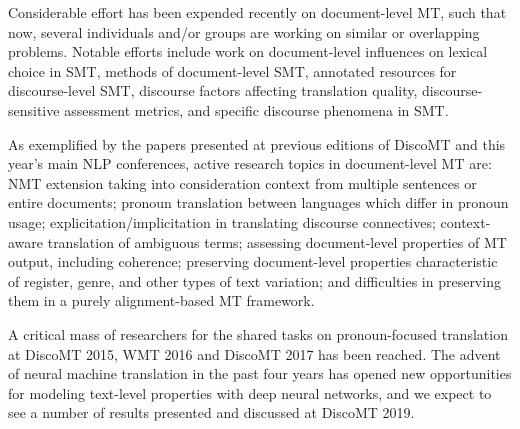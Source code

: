 \documentclass[11pt]{article}
\begin{document}
Considerable effort has been expended recently on document-level MT, such that now, several
individuals and/or groups are working on similar or overlapping problems.
Notable efforts include work on document-level influences on lexical choice in SMT, methods of document-level
SMT, annotated resources for discourse-level SMT, discourse factors affecting translation quality,
discourse-sensitive assessment metrics, and specific discourse phenomena in SMT.

As exemplified by the papers presented at previous editions of DiscoMT
and this year's main NLP conferences, active research topics in document-level MT are: 
NMT extension taking into consideration context from multiple sentences or
entire documents;
pronoun translation between languages which differ in pronoun usage; 
explicitation/implicitation in translating discourse connectives; 
context-aware translation of ambiguous terms; assessing document-level properties of MT
output, including coherence; preserving document-level
properties characteristic of register, genre, and other types of text variation; and difficulties 
in preserving them in a purely alignment-based MT framework.

A critical mass of researchers for the shared tasks
on pronoun-focused translation at DiscoMT 2015, WMT 2016 and DiscoMT 2017
has been reached.  The advent of neural machine 
translation in the past four years has opened new opportunities for modeling 
text-level properties with deep neural networks, and we expect to see a number
of results presented and discussed at DiscoMT 2019.



\end{document}
